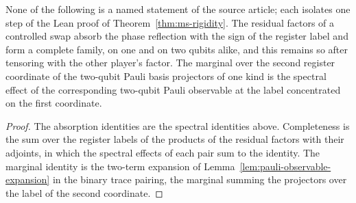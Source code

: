 \begin{lemma}\label{lem:ms-rigidity-support-intertwine}
	\leanok
	None of the following is a named statement of the source article; each isolates one step of the Lean proof of Theorem~\ref{thm:ms-rigidity}. The residual factors of a controlled swap absorb the phase reflection with the sign of the register label and form a complete family, on one and on two qubits alike, and this remains so after tensoring with the other player's factor. The marginal over the second register coordinate of the two-qubit Pauli basis projectors of one kind is the spectral effect of the corresponding two-qubit Pauli observable at the label concentrated on the first coordinate.
\end{lemma}
\begin{proof}
	\leanok
	The absorption identities are the spectral identities above. Completeness is the sum over the register labels of the products of the residual factors with their adjoints, in which the spectral effects of each pair sum to the identity. The marginal identity is the two-term expansion of Lemma~\ref{lem:pauli-observable-expansion} in the binary trace pairing, the marginal summing the projectors over the label of the second coordinate.
\end{proof}

